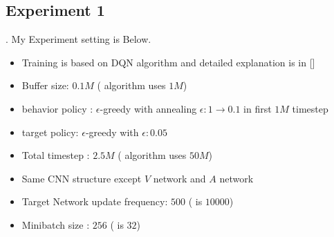 \documentclass[8pt]{beamer}
\begin{document}
\subsection{Experiment 1}


\begin{frame}{.}
    My Experiment setting is Below. 
    \begin{itemize}
        \item Training is based on DQN algorithm and detailed explanation is in [\cite{mnih2015human}]
        \item Buffer size: $0.1M$ (\cite{mnih2015human} algorithm uses $1M$)
        \item behavior policy : $\epsilon$-greedy with annealing $\epsilon : 1 \rightarrow 0.1$ in first $1M$ timestep
        \item target policy: $\epsilon$-greedy with $\epsilon: 0.05$
        \item Total timestep : $2.5M$ (\cite{mnih2015human} algorithm uses $50M$)
        \item Same CNN structure except $V$ network and $A$ network
        \item Target Network update frequency: $500$ (\cite{mnih2015human} is $10000$)
        \item Minibatch size : $256$ (\cite{mnih2015human} is $32$)
    \end{itemize}
\end{frame}
\end{document}
